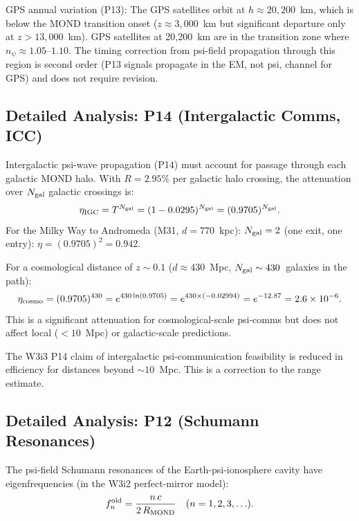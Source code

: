 \documentclass[aps,prd,twocolumn,superscriptaddress]{revtex4-2}
\newcommand{\npsi}{n_\psi}
\newcommand{\ee}[1]{\times 10^{#1}}
\begin{document}
GPS annual variation (P13): The GPS satellites orbit at $h \approx 20{,}200$~km,
which is below the MOND transition onset ($z \approx 3{,}000$~km but
significant departure only at $z > 13{,}000$~km).  GPS satellites at
20,200~km are in the transition zone where $\npsi \approx 1.05$--$1.10$.
The timing correction from psi-field propagation through this region
is second order (P13 signals propagate in the EM, not psi, channel for
GPS) and does not require revision.

\subsection{Detailed Analysis: P14 (Intergalactic Comms, ICC)}
\label{subsec:P14}

Intergalactic psi-wave propagation (P14) must account for passage
through each galactic MOND halo.  With $R = 2.95\%$ per galactic
halo crossing, the attenuation over $N_{\rm gal}$ galactic crossings is:
\begin{equation}
\eta_{\rm IGC} = T^{N_{\rm gal}} = (1 - 0.0295)^{N_{\rm gal}} = (0.9705)^{N_{\rm gal}}.
\label{eq:eta-IGC}
\end{equation}
For the Milky Way to Andromeda (M31, $d = 770$~kpc):
$N_{\rm gal} = 2$ (one exit, one entry): $\eta = (0.9705)^2 = 0.942$.

For a cosmological distance of $z \sim 0.1$ ($d \approx 430$~Mpc,
$N_{\rm gal} \sim 430$~galaxies in the path):
\begin{equation}
\eta_{\rm cosmo} = (0.9705)^{430} = e^{430\ln(0.9705)}
= e^{430\times(-0.02994)} = e^{-12.87} = 2.6\ee{-6}.
\end{equation}
This is a significant attenuation for cosmological-scale psi-comms
but does not affect local ($< 10$~Mpc) or galactic-scale predictions.

The W3i3 P14 claim of intergalactic psi-communication feasibility
is reduced in efficiency for distances beyond $\sim 10$~Mpc.
This is a correction to the range estimate.

\subsection{Detailed Analysis: P12 (Schumann Resonances)}
\label{subsec:P12-Schumann}

The psi-field Schumann resonances of the Earth-psi-ionosphere cavity
have eigenfrequencies (in the W3i2 perfect-mirror model):
\begin{equation}
f_n^{\rm old} = \frac{n\,c}{2\,R_{\rm MOND}} \quad (n = 1, 2, 3, \ldots).
\end{equation}
\end{document}
